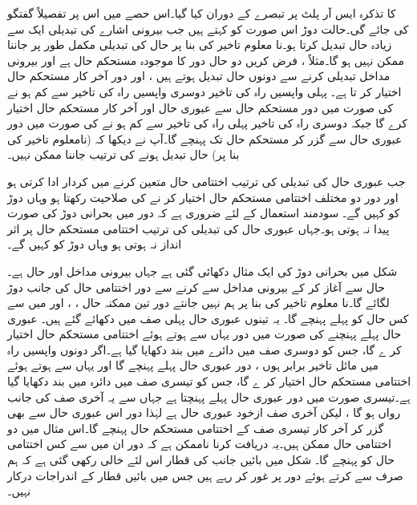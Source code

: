  کا تذکرہ  ایس آر پلٹ پر تبصرے کے  دوران کیا گیا۔اس حصے  میں اس پر تفصیلاً گفتگو  کی جائے گی۔حالت دوڑ اس صورت کو کہتے ہیں جب  بیرونی اشارے  کی تبدیلی   ایک سے زیادہ حال تبدیل  کرتا ہو۔نا معلوم تاخیر کی بنا پر حال  کی تبدیلی مکمل طور پر جاننا ممکن  نہیں ہو گا۔مثلاً ،   فرض کریں دو حال   دور کا موجودہ مستحکم حال   ہے اور  بیرونی مداخل تبدیلی  کرنے سے دونوں حال تبدیل ہوتے ہیں ، اور دور آخر کار   مستحکم حال اختیار کر تا ہے۔ پہلی واپسیں راہ کی تاخیر دوسری واپسیں راہ کی تاخیر سے کم ہو نے کی صورت میں  دور مستحکم حال   سے عبوری حال    اور آخر کار مستحکم حال  اختیار کرے گا جبکہ  دوسری راہ کی تاخیر پہلی راہ  کی تاخیر سے کم ہو نے کی صورت میں دور   عبوری حال   سے گزر کر مستحکم حال    تک پہنچے گا۔آپ نے دیکھا کہ  (نامعلوم   تاخیر  کی بنا پر)  حال تبدیل  ہونے کی ترتیب جاننا  ممکن نہیں۔

جب  عبوری حال   کی تبدیلی کی ترتیب   اختتامی حال متعین کرنے میں کردار ادا کرتی ہو اور   دور دو مختلف  اختتامی مستحکم حال اختیار کر نے کی صلاحیت رکھتا  ہو وہاں  دوڑ کو   کہیں گے۔   سودمند استعمال کے لئے ضروری ہے کہ دور میں بحرانی دوڑ   کی صورت  پیدا نہ ہوتی ہو۔جہاں عبوری حال  کی تبدیلی کی ترتیب  اختتامی مستحکم حال پر اثر انداز نہ ہوتی ہو وہاں  دوڑ کو کہیں گے۔



شکل میں بحرانی دوڑ کی ایک مثال   دکھائی گئی ہے  جہاں بیرونی مداخل   اور  حال     ہے۔ حال  سے آغاز  کر کے بیرونی مداخل   سے    کرنے سے  دور  اختتامی  حال  کی جانب دوڑ لگائے گا۔نا معلوم تاخیر کی بنا پر   ہم نہیں جانتے دور تین ممکنہ حال   ، ، اور   میں سے کس حال   کو پہلے پہنچے گا۔  یہ تینوں عبوری حال  پہلی صف میں دکھائے گئے ہیں۔  عبوری حال     پہلے پہنچنے کی صورت میں  دور   یہاں سے ہوتے ہوئے  اختتامی مستحکم حال   اختیار کر ے گا، جس کو دوسری صف میں دائرے میں بند  دکھایا  گیا ہے۔اگر دونوں واپسیں راہ میں مائل تاخیر  برابر ہوں ، دور   عبوری حال      پہلے پہنچے گا اور یہاں سے ہوتے ہوئے  اختتامی مستحکم حال   اختیار کر ے گا، جس کو تیسری صف میں دائرہ میں بند دکھایا گیا ہے۔تیسری صورت میں دور عبوری حال   پہلے   پہنچتا ہے جہاں  سے یہ آخری صف کی جانب رواں ہو گا ، لیکن آخری صف ازخود عبوری حال ہے لہٰذا  دور  اس عبوری حال سے بھی گزر کر آخر کار تیسری  صف کے اختتامی  مستحکم حال    پہنچے گا۔اس مثال میں دو  اختتامی حال ممکن ہیں۔یہ دریافت کرنا ناممکن ہے کہ دور ان میں سے کس  اختتامی حال  کو پہنچے گا۔ شکل میں بائیں  جانب  کی قطار اس لئے  خالی  رکھی گئی ہے کہ ہم صرف   سے     کرتے   ہوئے دور پر غور کر رہے ہیں جس میں بائیں قطار    کے اندراجات   درکار نہیں۔

